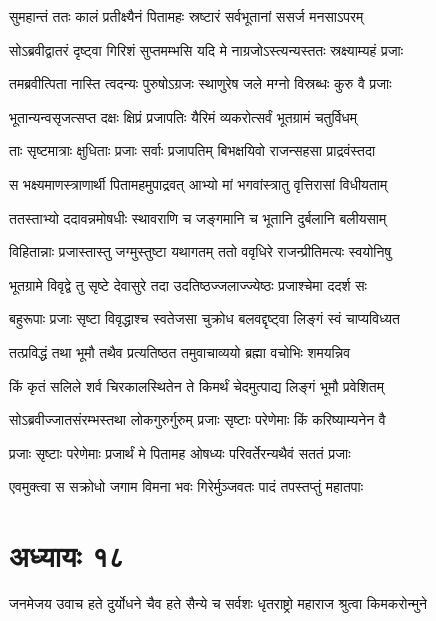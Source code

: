 \twolineshloka
{सुमहान्तं ततः कालं प्रतीक्ष्यैनं पितामहः}
{स्रष्टारं सर्वभूतानां ससर्ज मनसाऽपरम्}


\twolineshloka
{सोऽब्रवीद्वातरं दृष्ट्वा गिरिशं सुप्तमम्भसि}
{यदि मे नाग्रजोऽस्त्यन्यस्ततः स्रक्ष्याम्यहं प्रजाः}


\twolineshloka
{तमब्रवीत्पिता नास्ति त्वदन्यः पुरुषोऽग्रजः}
{स्थाणुरेष जले मग्नो विस्रब्धः कुरु वै प्रजाः}


\twolineshloka
{भूतान्यन्वसृजत्सप्त दक्षः क्षिप्रं प्रजापतिः}
{यैरिमं व्यकरोत्सर्वं भूतग्रामं चतुर्विधम्}


\twolineshloka
{ताः सृष्टमात्राः क्षुधिताः प्रजाः सर्वाः प्रजापतिम्}
{बिभक्षयिवो राजन्सहसा प्राद्रवंस्तदा}


\twolineshloka
{स भक्ष्यमाणस्त्राणार्थी पितामहमुपाद्रवत्}
{आभ्यो मां भगवांस्त्रातु वृत्तिरासां विधीयताम्}


\twolineshloka
{ततस्ताभ्यो ददावन्नमोषधीः स्थावराणि च}
{जङ्गमानि च भूतानि दुर्बलानि बलीयसाम्}


\twolineshloka
{विहितान्नाः प्रजास्तास्तु जग्मुस्तुष्टा यथागतम्}
{ततो ववृधिरे राजन्प्रीतिमत्यः स्वयोनिषु}


\twolineshloka
{भूतग्रामे विवृद्वे तु सृष्टे देवासुरे तदा}
{उदतिष्ठज्जलाज्ज्येष्ठः प्रजाश्चेमा ददर्श सः}


\twolineshloka
{बहुरूपाः प्रजाः सृष्टा विवृद्धाश्च स्वतेजसा}
{चुक्रोध बलवद्दृष्ट्वा लिङ्गं स्वं चाप्यविध्यत}


\twolineshloka
{तत्प्रविद्धं तथा भूमौ तथैव प्रत्यतिष्ठत}
{तमुवाचाव्ययो ब्रह्मा वचोभिः शमयन्निव}


\twolineshloka
{किं कृतं सलिले शर्व चिरकालस्थितेन ते}
{किमर्थं चेदमुत्पाद्य लिङ्गं भूमौ प्रवेशितम्}


\twolineshloka
{सोऽब्रवीज्जातसंरम्भस्तथा लोकगुरुर्गुरुम्}
{प्रजाः सृष्टाः परेणेमाः किं करिष्याम्यनेन वै}


\twolineshloka
{प्रजाः सृष्टाः परेणेमाः प्रजार्थं मे पितामह}
{ओषध्यः परिवर्तेरन्यथैवं सततं प्रजाः}


\twolineshloka
{एवमुक्त्वा स सक्रोधो जगाम विमना भवः}
{गिरेर्मुञ्जवतः पादं तपस्तप्तुं महातपाः}


\chapter{अध्यायः १८}
\threelineshloka
{जनमेजय उवाच}
{हते दुर्योधने चैव हते सैन्ये च सर्वशः}
{धृतराष्ट्रो महाराज श्रुत्वा किमकरोन्मुने}


